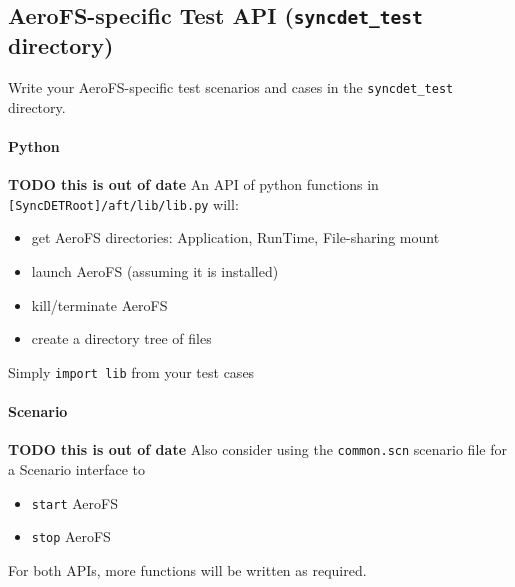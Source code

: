 \subsection{AeroFS-specific Test API ({\tt syncdet\_test} directory)}
Write your AeroFS-specific test scenarios and cases in the {\tt syncdet\_test}
directory.

\paragraph{Python}
{\bf TODO this is out of date}
An API of python functions in {\tt [SyncDETRoot]/aft/lib/lib.py} will:
\begin{itemize}
\item get AeroFS directories: Application, RunTime, File-sharing mount
\item launch AeroFS (assuming it is installed)
\item kill/terminate AeroFS
\item create a directory tree of files
\end{itemize}
Simply {\tt import lib} from your test cases


\paragraph{Scenario}
{\bf TODO this is out of date}
Also consider using the {\tt common.scn} scenario file for a Scenario interface
to
\begin{itemize}
\item {\tt start} AeroFS
\item {\tt stop} AeroFS
\end{itemize}

For both APIs, more functions will be written as required.
